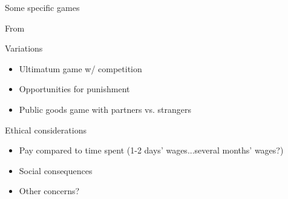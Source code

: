 \documentclass[xcolor={dvipsnames},handout]{beamer}
\begin{document}

\begin{frame}{Some specific games}

From \cite{camerer2004measuring}

\end{frame}




{

}
\begin{frame}{Variations}

\begin{itemize}
\item Ultimatum game w/ competition
\item Opportunities for punishment 
\item Public goods game with partners vs. strangers
\end{itemize}

\end{frame}




\begin{frame}{Ethical considerations}

\begin{itemize}
\item Pay compared to time spent  (1-2 days' wages...several months' wages?)
\item Social consequences
\item Other concerns?
\end{itemize}

\end{frame}
\end{document}
